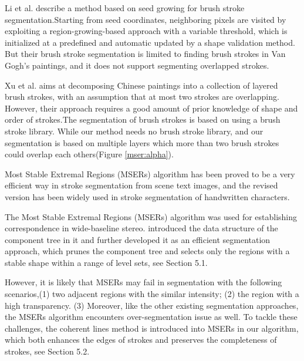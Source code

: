 Li et al.\cite{li2012rhythmic} describe a method based on seed growing for brush stroke segmentation.Starting from seed coordinates, neighboring pixels are visited by exploiting a region-growing-based approach with a variable threshold, which is initialized at a predefined and automatic updated by a shape validation method. But their brush stroke segmentation is limited to finding brush strokes in Van Gogh's paintings, and it does not support segmenting overlapped strokes.

Xu et al.\cite{xu2006animating} aims at decomposing Chinese paintings into a collection of layered brush strokes, with an assumption that at most two strokes are overlapping. However, their approach requires a good amount of prior knowledge of shape and order of strokes.The segmentation of brush strokes is based on using a brush stroke library. While our method needs no brush stroke library, and our segmentation is based on multiple layers which more than two brush strokes could overlap each others(Figure \ref{mser:alpha}). 

Most Stable Extremal Regions (MSERs) algorithm\cite{matas2004robust} has been proved to be a very efficient way in stroke segmentation from scene text images\cite{neumann2011text}\cite{gomez2013multi}, 
and the revised version has been widely used in stroke segmentation of handwritten characters\cite{gomez2016fast}.

The Most Stable Extremal Regions (MSERs) algorithm\cite{matas2004robust} was used for establishing correspondence in wide-baseline stereo.\cite{donoser2006efficient} introduced the data structure of the component tree in it and further developed it as an efficient segmentation approach, which prunes the component tree and selects only the regions with a stable shape within a range of level sets, see Section 5.1.

However, it is likely that MSERs may fail in segmentation with the following scenarios,\newline (1) two adjacent regions with the similar intensity; \newline (2) the region with a high transparency. \newline
(3) Moreover, like the other existing segmentation approaches, the MSERs algorithm encounters over-segmentation issue as well. To tackle these challenges, the coherent lines method \cite{kang2007coherent} is introduced into MSERs in our algorithm, which both enhances the edges of strokes and preserves the completeness of strokes, see Section 5.2. 

\newpage
